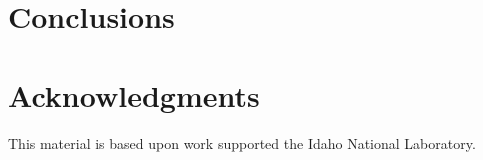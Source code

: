 \documentclass{anstrans}
\begin{document}
\section{Conclusions}



\section{Acknowledgments}
This material is based upon work supported the Idaho National Laboratory.



\end{document}
